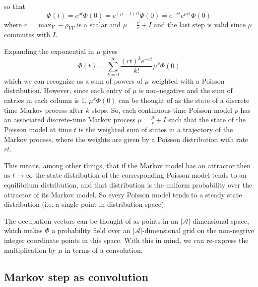 \documentclass[a4paper]{article}
\begin{document}
so that
\[
\Phi(t) = e^{\rho t}\Phi(0) = e^{(\mu - I)rt}\Phi(0) = e^{-rt}e^{\mu rt}\Phi(0)
\]
where $r = \max_V -\rho_{VV}$ is a scalar and $\mu = \frac{\rho}{r} + I$ and the last step is valid since $\mu$ commutes with $I$.

Expanding the exponential in $\mu$ gives
\[
\Phi(t)  = \sum_{k=0}^\infty \frac{ (rt)^k e^{-rt}}{k!}\mu^k\Phi(0)
\]
which we can recognize as a sum of powers of $\mu$ weighted with a Poisson distribution. However, since each entry of $\mu$ is non-negative and the sum of entries in each column is 1, $\mu^k \Phi(0)$ can be thought of as the state of a discrete time Markov process after $k$ steps. So, each continuous-time Poisson model $\rho$ has an associated discrete-time Markov process $\mu = \frac{\rho}{r} + I$ such that the state of the Poisson model at time $t$ is the weighted sum of states in a trajectory of the Markov process, where the weights are given by a Poisson distribution with rate $rt$.

This means, among other things, that if the Markov model has an attractor then as $t \to \infty$ the state distribution of the corresponding Poisson model tends to an equilibrium distribution, and that distribution is the uniform probability over the attractor of its Markov model. So every Poisson model tends to a steady state distribution (i.e. a single point in distribution space).

The occupation vectors can be thought of as points in an $|\mathcal{A}|$-dimensional space, which makes $\Phi$ a probability field over an $|\mathcal{A}|$-dimensional grid on the non-negtive integer coordinate points in this space. With this in mind, we can re-express the multiplication by $\mu$ in terms of a convolution.

\subsection{Markov step as convolution}
\end{document}

